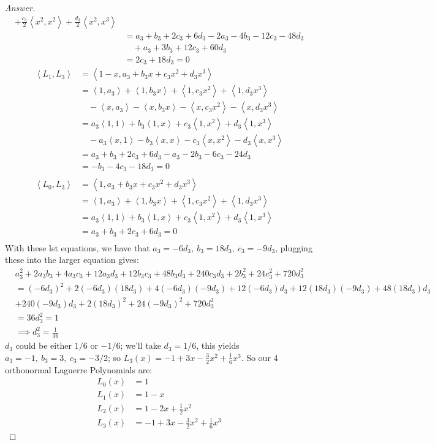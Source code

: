 \documentclass{article}
\newcommand{\abracks}[1]{\left< #1\right>}
\begin{document}
\begin{proof}[Answer]
\begin{align*}
    + \frac{c_3}{2}\abracks{x^2, x^2} + \frac{d_3}{2}\abracks{x^2, x^3} \\
    &= a_3 + b_3 + 2c_3 + 6d_3  - 2a_3 - 4b_3 - 12c_3 - 
    48d_3 \\
    &\quad + a_3 + 3b_3 + 12c_3 + 60d_3 \\
    &= 2c_3 + 18d_3 = 0 
    \end{align*}
    \begin{align*}
    \abracks{L_1, L_3} &= \abracks{1-x, a_3 + b_3x + c_3x^2 + d_3x^3} \\
    &= \abracks{1, a_3} + \abracks{1, b_3x} + \abracks{1, c_3x^2} + \abracks{1, d_3x^3} \\
    &\quad - \abracks{x, a_3} - \abracks{x, b_3x} - \abracks{x, c_3x^2} - \abracks{x, d_3x^3} \\
    &= a_3\abracks{1, 1} + b_3\abracks{1, x} + c_3\abracks{1, x^2} + d_3\abracks{1, x^3} \\
    &\quad - a_3\abracks{x, 1} - b_3\abracks{x, x} - c_3\abracks{x, x^2} - d_3\abracks{x, x^3} \\
    &= a_3 + b_3 + 2c_3 + 6d_3 - a_3 - 2b_3 - 6c_3 - 24d_3 \\
    &= -b_3 - 4c_3 - 18d_3 = 0 \\\\
    \abracks{L_0, L_3} &= \abracks{1, a_3 + b_3x + c_3x^2 + d_3x^3} \\
    &= \abracks{1, a_3} + \abracks{1, b_3x} + \abracks{1, c_3x^2} + \abracks{1, d_3x^3} \\
    &= a_3\abracks{1, 1} + b_3\abracks{1, x} + c_3\abracks{1, x^2} + d_3\abracks{1, x^3} \\
    &= a_3 + b_3 + 2c_3 + 6d_3 = 0 \\
    \end{align*}
    With these lst equations, we have that $a_3 = -6d_3,\ b_3 = 18d_3,\ c_3 = -9d_3$, plugging
    these into the larger equation gives:
    \begin{align*}
    &a_3^2 + 2a_3b_3 + 4a_3c_3 + 12a_3d_3 + 12b_3c_3 + 48b_3d_3 + 240c_3d_3 + 2b_3^2 + 
    24c_3^2 + 720d_3^2 & \\
    &= (-6d_3)^2 + 2(-6d_3)(18d_3) + 4(-6d_3)(-9d_3) + 12(-6d_3)d_3 + 
    12(18d_3)(-9d_3) + 48(18d_3)d_3 & \\
    &+ 240(-9d_3)d_3 + 2(18d_3)^2 + 24(-9d_3)^2 + 720d_3^2& \\
    &= 36d_3^2 = 1& \\
    &\implies d_3^2 = \frac{1}{36}&
    \end{align*}
    $d_3$ could be either $1/6$ or $-1/6$; we'll take $d_3 = 1/6$, this yields $a_3 = -1,\ 
    b_3 = 3,\ c_3 = -3/2$; so $L_3(x) = -1 + 3x - \frac{3}{2}x^2 + \frac{1}{6}x^3$. 
    So our 4 orthonormal Laguerre Polynomials are:
    \begin{align*}
    L_0(x) &= 1 \\
    L_1(x) &= 1 - x \\
    L_2(x) &= 1 - 2x + \frac{1}{2}x^2 \\
    L_3(x) &= -1 + 3x - \frac{3}{2}x^2 + \frac{1}{6}x^3
    \end{align*}
    \end{proof}
\end{document}
